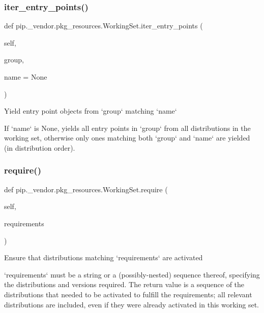 \subsubsection{\texorpdfstring{iter\+\_\+entry\+\_\+points()}{iter\_entry\_points()}}
{\footnotesize\ttfamily def pip.\+\_\+vendor.\+pkg\+\_\+resources.\+Working\+Set.\+iter\+\_\+entry\+\_\+points (\begin{DoxyParamCaption}\item[{}]{self,  }\item[{}]{group,  }\item[{}]{name = {\ttfamily None} }\end{DoxyParamCaption})}

\begin{DoxyVerb}Yield entry point objects from `group` matching `name`

If `name` is None, yields all entry points in `group` from all
distributions in the working set, otherwise only ones matching
both `group` and `name` are yielded (in distribution order).
\end{DoxyVerb}
 \mbox{\label{classpip_1_1__vendor_1_1pkg__resources_1_1WorkingSet_a578e5a938047f53986c4eb860621e367}} 
\subsubsection{\texorpdfstring{require()}{require()}}
{\footnotesize\ttfamily def pip.\+\_\+vendor.\+pkg\+\_\+resources.\+Working\+Set.\+require (\begin{DoxyParamCaption}\item[{}]{self,  }\item[{}]{requirements }\end{DoxyParamCaption})}

\begin{DoxyVerb}Ensure that distributions matching `requirements` are activated

`requirements` must be a string or a (possibly-nested) sequence
thereof, specifying the distributions and versions required.  The
return value is a sequence of the distributions that needed to be
activated to fulfill the requirements; all relevant distributions are
included, even if they were already activated in this working set.
\end{DoxyVerb}
 \mbox{\label{classpip_1_1__vendor_1_1pkg__resources_1_1WorkingSet_a3ec2a2ca189616895b93a5a7820d0e94}} 
